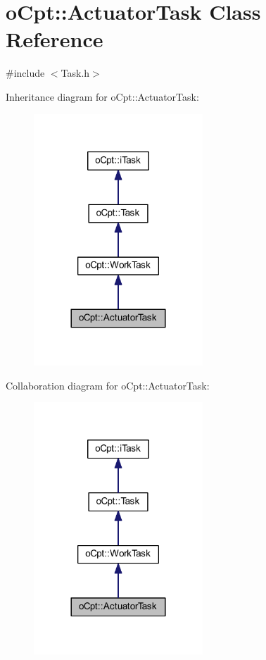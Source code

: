 \hypertarget{classo_cpt_1_1_actuator_task}{}\section{o\+Cpt\+:\+:Actuator\+Task Class Reference}
\label{classo_cpt_1_1_actuator_task}


{\ttfamily \#include $<$Task.\+h$>$}



Inheritance diagram for o\+Cpt\+:\+:Actuator\+Task\+:
\nopagebreak
\begin{figure}[H]
\begin{center}
\leavevmode
\includegraphics[width=180pt]{classo_cpt_1_1_actuator_task__inherit__graph}
\end{center}
\end{figure}


Collaboration diagram for o\+Cpt\+:\+:Actuator\+Task\+:
\nopagebreak
\begin{figure}[H]
\begin{center}
\leavevmode
\includegraphics[width=180pt]{classo_cpt_1_1_actuator_task__coll__graph}
\end{center}
\end{figure}

